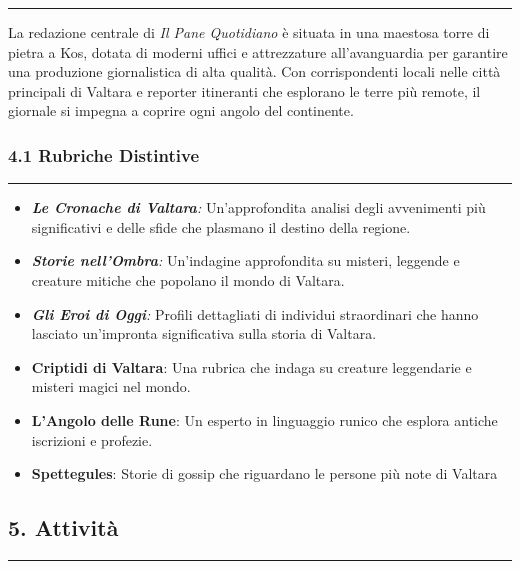 \begin{center}\rule{0.5\linewidth}{0.5pt}\end{center}

La redazione centrale di \emph{Il Pane Quotidiano} è situata in una
maestosa torre di pietra a Kos, dotata di moderni uffici e attrezzature
all'avanguardia per garantire una produzione giornalistica di alta
qualità. Con corrispondenti locali nelle città principali di Valtara e
reporter itineranti che esplorano le terre più remote, il giornale si
impegna a coprire ogni angolo del continente.

\subsubsection{\texorpdfstring{4.1 \textbf{Rubriche
Distintive}}{4.1 Rubriche Distintive}}\label{rubriche-distintive}

\begin{center}\rule{0.5\linewidth}{0.5pt}\end{center}

\begin{itemize}
\tightlist
\item
  \emph{\textbf{Le Cronache di Valtara}:} Un'approfondita analisi degli
  avvenimenti più significativi e delle sfide che plasmano il destino
  della regione.
\item
  \emph{\textbf{Storie nell'Ombra}:} Un'indagine approfondita su
  misteri, leggende e creature mitiche che popolano il mondo di Valtara.
\item
  \emph{\textbf{Gli Eroi di Oggi}:} Profili dettagliati di individui
  straordinari che hanno lasciato un'impronta significativa sulla storia
  di Valtara.
\item
  \textbf{Criptidi di Valtara}: Una rubrica che indaga su creature
  leggendarie e misteri magici nel mondo.
\item
  \textbf{L'Angolo delle Rune}: Un esperto in linguaggio runico che
  esplora antiche iscrizioni e profezie.
\item
  \textbf{Spettegules}: Storie di gossip che riguardano le persone più
  note di Valtara
\end{itemize}

\subsection{5. Attività}\label{attivituxe0}

\begin{center}\rule{0.5\linewidth}{0.5pt}\end{center}

